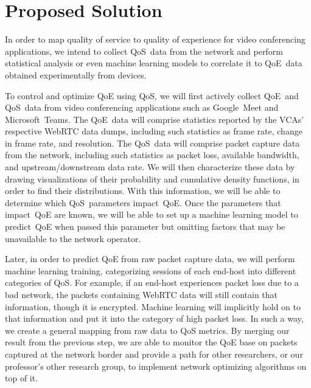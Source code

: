 \section{Proposed Solution}\label{proposed-solution}
    In order to map quality of service to quality of experience for video conferencing applications, we intend to collect QoS~data from the network and perform statistical analysis or even machine learning models to correlate it to QoE~data obtained experimentally from devices.

    To control and optimize QoE using QoS, we will first actively collect QoE~and QoS~data from video conferencing applications such as Google~Meet and Microsoft~Teams. The QoE~data will comprise statistics reported by the VCAs' respective WebRTC data dumps, including such statistics as frame rate, change in frame rate, and resolution. The QoS~data will comprise packet capture data from the network, including such statistics as packet loss, available bandwidth, and upstream/downstream data rate. We will then characterize these data by drawing visualizations of their probability and cumulative density functions, in order to find their distributions. With this information, we will be able to determine which QoS~parameters impact~QoE. Once the parameters that impact~QoE are known, we will be able to set up a machine learning model to predict~QoE when passed this parameter but omitting factors that may be unavailable to the network operator.

    Later, in order to predict QoE from raw packet capture data, we will perform machine learning training, categorizing sessions of each end-host into different categories of QoS. For example, if an end-host experiences packet loss due to a bad network, the packets containing WebRTC data will still contain that information, though it is encrypted. Machine learning will implicitly hold on to that information and put it into the category of high packet loss. In such a way, we create a general mapping from raw data to QoS metrics. By merging our result from the previous step, we are able to monitor the QoE base on packets captured at the network border and provide a path for other researchers, or our professor's other research group, to implement network optimizing algorithms on top of it. 